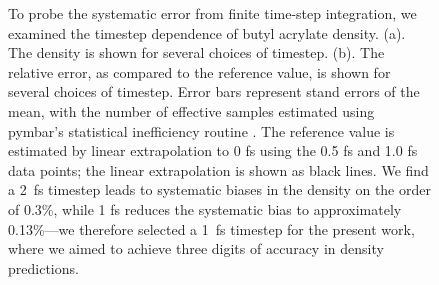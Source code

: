 \documentclass[aps,pre,twocolumn,nofootinbib,superscriptaddress,linenumbers]{revtex4-1}
\begin{document}
\begin{figure}


\caption{
To probe the systematic error from finite time-step integration, we examined the timestep dependence of butyl acrylate density.  
(a).  The density is shown for several choices of timestep.  
(b).  The relative error, as compared to the reference value, is shown for several choices of timestep.  
Error bars represent stand errors of the mean, with the number of effective samples estimated using pymbar's statistical inefficiency routine \cite{shirts2008statistically}.  
The reference value is estimated by linear extrapolation to 0 fs using the 0.5 fs and 1.0 fs data points; the linear extrapolation is shown as black lines.  
We find a 2~fs timestep leads to systematic biases in the density on the order of 0.3\%, while 1 fs reduces the systematic bias to approximately 0.13\%---we therefore selected a 1~fs timestep for the present work, where we aimed to achieve three digits of accuracy in density predictions.
}
\label{figure:timestep}

\end{figure}




\end{document}
